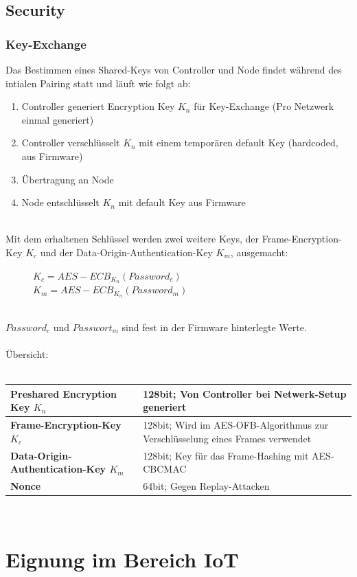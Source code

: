 \documentclass[a4paper,11pt]{article}
\begin{document}
\subsection*{Security}
\subsubsection*{Key-Exchange}
Das Bestimmen eines Shared-Keys von Controller und Node findet während des intialen Pairing statt und läuft wie folgt ab:
\begin{enumerate}
	\item Controller generiert Encryption Key $K_{n}$ für Key-Exchange (Pro Netzwerk einmal generiert)
	\item Controller verschlüsselt $K_{n}$ mit einem temporären default Key (hardcoded, aus Firmware)
	\item Übertragung an Node
	\item Node entschlüsselt $K_{n}$ mit default Key aus Firmware
\end{enumerate}~\\
Mit dem erhaltenen Schlüssel werden zwei weitere Keys, der Frame-Encryption-Key $K_{c}$ und der Data-Origin-Authentication-Key $K_{m}$, ausgemacht:
\begin{figure}[h!t]
	\centering
	\large
	$K_{c} = AES-ECB_{K_{n}}(Password_{c})$\\
	$K_{m} = AES-ECB_{K_{n}}(Password_{m})$
\end{figure}~\\
$Password_{c}$ und $Passwort_{m}$ sind fest in der Firmware hinterlegte Werte.
\\\\
Übersicht:\\\\
\begin{tabular}{| p{6cm} | p{8cm} |}
	\hline
	\textbf{Preshared Encryption Key $K_{n}$} & 128bit; Von Controller bei Netwerk-Setup generiert\\\hline
	\textbf{Frame-Encryption-Key $K_{c}$} & 128bit; Wird im AES-OFB-Algorithmus zur Verschlüsselung eines Frames verwendet\\\hline
	\textbf{Data-Origin-Authentication-Key $K_{m}$} & 128bit; Key für das Frame-Hashing mit AES-CBCMAC\\\hline
	\textbf{Nonce} & 64bit; Gegen Replay-Attacken\\\hline
\end{tabular}~\newpage

\section*{Eignung im Bereich IoT}
\end{document}
